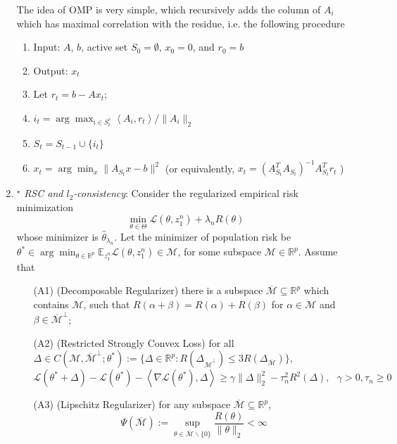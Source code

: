\documentclass[11pt]{article}
\def\L{{\mathcal L}}
\def\M{{\mathcal M}}
\def\R{{\mathbb R}}
\def\E{{\mathbb E}}
\begin{document}
\begin{enumerate}
The idea of OMP is very simple, which recursively adds the column of $A_i$ which has maximal correlation with the residue, i.e. the following procedure
\begin{enumerate}
\item Input: $A$, $b$, active set $S_0=\emptyset$, $x_0=0$, and $r_0=b$
\item Output: $x_t$
\item Let $r_t=b - A x_t$;
\item $i_t=\arg \max_{i \in S_t^{c}} \left< A_i, r_t\right>/\|A_i\|_2$
\item $S_t = S_{t-1} \cup \{i_t\}$
\item $x_t = \arg\min_x \|A_{S_t} x - b\|^2$ (or equivalently, $x_t = (A_{S_t}^T A_{S_t})^{-1} A_{S_t}^T r_t$ )
\end{enumerate}


\item $^\star$ {\em RSC and $l_2$-consistency}: Consider the regularized empirical risk minimization
\[ \min_{\theta\in \Theta} \L( \theta, z_1^n) + \lambda_n R(\theta) \]
whose minimizer is $\hat{\theta}_{\lambda_n}$. Let the minimizer of population risk be $\theta^\ast \in \arg\min_{\theta \in \R^p} \E_{z_1^n} \L( \theta, z_1^n) \in \M$, for some subspace $\M\in \R^p$. Assume that
\begin{itemize}
\item[(A1)] (Decomposable Regularizer) there is a subspace $\overline{\M} \subseteq \R^p$ which contains $\M$, such that $R(\alpha + \beta) = R(\alpha) + R(\beta)$ for $\alpha\in \M$ and $\beta\in \overline{\M}^\perp$;
\item[(A2)] (Restricted Strongly Convex Loss) for all $\Delta \in C(\M,\overline{\M}^\perp;\theta^\ast) :=\{\Delta\in \R^p: R(\Delta_{\overline{\M}^\perp}) \leq 3 R(\Delta_{\overline{\M}})\}$,
\[ \L(\theta^\ast + \Delta) - \L(\theta^\ast) - \left< \nabla \L(\theta^\ast), \Delta \right> \geq \gamma \|\Delta\|_2^2 - \tau_n^2 R^2(\Delta), \ \ \ \gamma>0, \tau_n \geq 0 \]
\item[(A3)] (Lipschitz Regularizer) for any subspace $\overline{\M}\subseteq \R^p$,
\[   \Psi(\overline{\M}) := \sup_{\theta \in \overline{\M}\backslash \{0\}} \frac{R(\theta)} {\|\theta\|_2} <\infty \]
 \end{itemize}


\end{enumerate}
\end{document}
